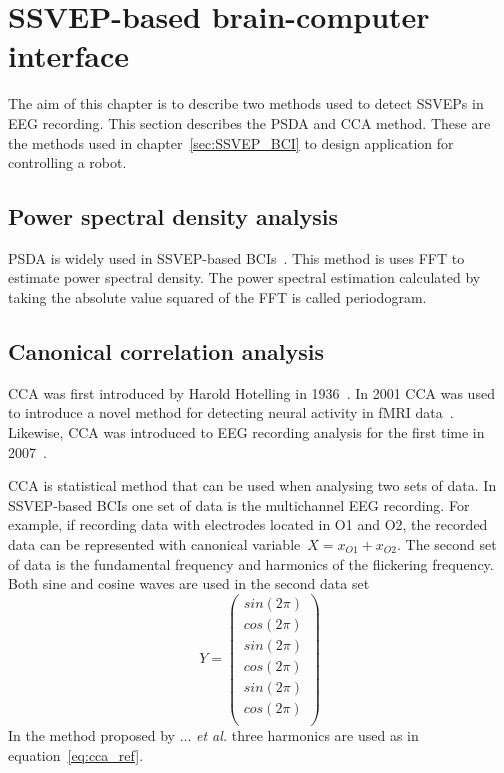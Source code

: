 \section{SSVEP-based brain-computer interface}
\label{sec:SSVEP_detection}
The aim of this chapter is to describe two methods used to detect \glspl{SSVEP} in \gls{EEG} recording. 
This section describes the \gls{PSDA} and \gls{CCA} method. These are the methods used in chapter~\ref{sec:SSVEP_BCI} to design application for controlling a robot. 

\subsection{Power spectral density analysis}

\Gls{PSDA} is widely used in \gls{SSVEP}-based \glspl{BCI}~\cite{bin2009cca}. This method is uses \gls{FFT} to estimate power spectral density. The power spectral estimation calculated by taking the absolute value squared of the \gls{FFT} is called periodogram. 

\subsection{Canonical correlation analysis}

\Gls{CCA} was first introduced by Harold Hotelling in 1936~\cite{cca_hotelling}. In 2001 \gls{CCA} was used to introduce a novel method for detecting neural activity in \gls{fMRI} data~\cite{cca_fmri}. Likewise, \gls{CCA} was introduced to \gls{EEG} recording analysis for the first time in 2007~\cite{cca_lin}. 

\Gls{CCA} is statistical method that can be used when analysing two sets of data. In \gls{SSVEP}-based \glspl{BCI} one set of data is the multichannel \gls{EEG} recording. For example, if recording data with electrodes located in O1 and O2, the recorded data can be represented with canonical variable~$X=x_{O1}+x_{O2}$. The second set of data is the \gls{fundamental} frequency and \glspl{harmonic} of the \gls{flickering} frequency. Both sine and cosine waves are used in the second data set %
\begin{equation}
	\label{eq:cca_ref}
	Y=\left(\begin{matrix}
		sin(2\pi)\\
		cos(2\pi)\\
		sin(2\pi)\\
		cos(2\pi)\\
		sin(2\pi)\\
		cos(2\pi)\\
	\end{matrix}\right)
\end{equation}
In the method proposed by ... \textit{et al.} three harmonics are used as in equation~\ref{eq:cca_ref}.
